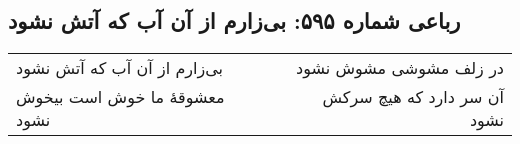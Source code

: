 \begin{center}
\section*{رباعی شماره ۵۹۵: بی‌زارم از آن آب که آتش نشود}
\label{sec:0595}
\begin{longtable}{l p{0.5cm} r}
بی‌زارم از آن آب که آتش نشود
&&
در زلف مشوشی مشوش نشود
\\
معشوقهٔ ما خوش است بیخوش نشود
&&
آن سر دارد که هیچ سرکش نشود
\\
\end{longtable}
\end{center}
